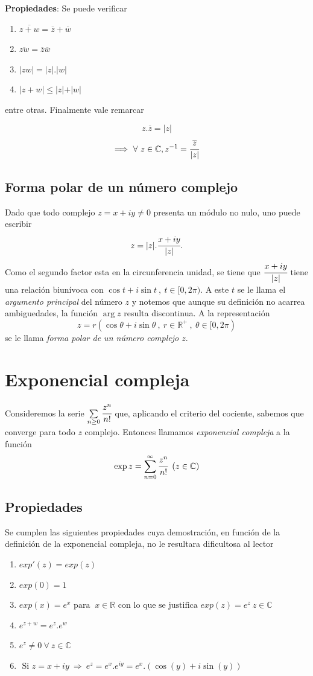 \documentclass[a4paper,spanish]{article}
\def\C {\mathbb{C}}
\def\R {\mathbb{R}}
\numberwithin{equation}{section}
\begin{document}
\textbf{Propiedades}: Se puede verificar
\begin{enumerate}
\item $\overline{z+w}=\overline{z}+\overline{w}$
\item $\overline{zw}=\overline{z}\overline{w}$
\item $\vert{zw}\vert=\vert {z}\vert.\vert {w}\vert$
\item $\vert {z+w}\vert\leq \vert {z}\vert +\vert {w}\vert$
\end{enumerate}
entre otras. Finalmente vale remarcar

\[z.\overline{z}=\vert{z}\vert\]
\[\Longrightarrow \ \forall \ {z} \in \C, z^{-1}=\cfrac{\overline{z}}{\vert{z}\vert}\]

\subsection{Forma polar de un n\'umero complejo}
Dado que todo complejo $z=x+iy\neq{0}$ presenta un m\'odulo no
nulo, uno puede escribir
\[z=\vert{z}\vert.\cfrac{x+iy}{\vert{z}\vert}.\] Como el segundo
factor esta en la circunferencia unidad, se tiene que
$\cfrac{x+iy}{\vert{z}\vert}$ tiene una relaci\'on
biun\'ivoca con $\cos{t} + i\sin{t} \ , \ t\in{[0,2\pi)} $. A este $t$
se le llama el \textit{argumento principal} del n\'umero $z$ y
notemos que aunque su definici\'on no acarrea ambiguedades, la
funci\'on $\arg {z} $ resulta discontinua. A la representaci\'on
\[z=r(\cos{\theta}+i\sin{\theta} \ , \ r \in \R^+ \ , \ \theta \in
[0,2 \pi)\] se le llama \textit{forma polar de un n\'umero complejo $z$}.


\section{Exponencial compleja}

Consideremos la serie $\sum\limits_{n\geq{0}} \cfrac{z^n}{n!} $ que, aplicando el criterio del cociente, sabemos que converge para todo $z$ complejo.
Entonces llamamos \textit{exponencial compleja} a la funci\'on \\
\[ \exp{z}= \sum_{n=0} ^{\infty} \cfrac{z^n}{n!} \ \left( z \in \C \right) \]

\subsection{Propiedades}
Se cumplen las siguientes propiedades cuya demostraci\'on, en funci\'on de la definici\'on de la exponencial compleja, no le resultara dificultosa al lector
\begin{enumerate}

\item $exp'(z) = exp (z)$ 
\item $ exp (0) = 1 $
\item $ exp (x)= e^{x} \mbox{ para } \ x \in \R \mbox{  con lo que se justifica } exp (z) = e^{z} \ z \in \C $
\item $ e^{z+w}= e^{z}.e^{w}$
\item $ e^{z} \neq 0 \ \forall \ z \in \C$
\item $ \mbox{ Si } z= x+iy \ \Longrightarrow \ e^{z} = e^{x}.e^{iy} = e^{x}.(\cos(y)+i\sin(y))$

\end{enumerate}
\end{document}
